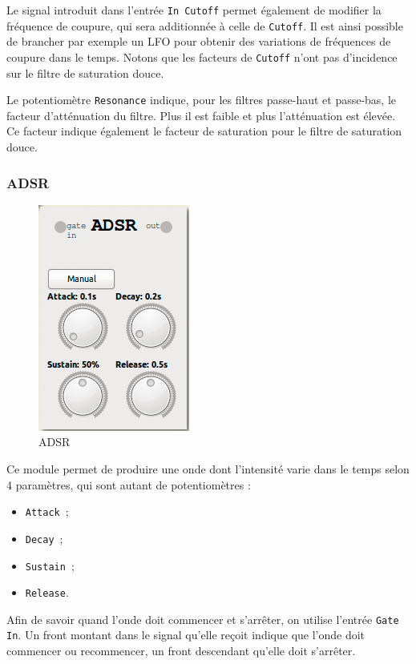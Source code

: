 \documentclass[a4paper,oneside,frenchb,12pt]{article}
\begin{document}
Le signal introduit dans l'entrée \verb!In Cutoff! permet également de
modifier la fréquence de coupure, qui sera additionnée à celle de
\verb!Cutoff!. Il est ainsi possible de brancher par exemple un LFO pour
obtenir des variations de fréquences de coupure dans le temps. Notons
que les facteurs de \verb!Cutoff! n'ont pas d'incidence sur le filtre de
saturation douce.

Le potentiomètre \verb!Resonance! indique, pour les filtres passe-haut
et passe-bas, le facteur d'atténuation du filtre. Plus il est faible et
plus l'atténuation est élevée. Ce facteur indique également le facteur
de saturation pour le filtre de saturation douce.

\subsubsection{ADSR}

\begin{figure}[h!]
\centering
\includegraphics[scale=0.5]{../img/png/adsr.png}
\caption{ADSR}
\end{figure}

Ce module permet de produire une onde dont l'intensité varie dans le
temps selon 4 paramètres, qui sont autant de potentiomètres :

\begin{itemize}
\item
  \verb!Attack!~;
\item
  \verb!Decay!~;
\item
  \verb!Sustain!~;
\item
  \verb!Release!.
\end{itemize}
Afin de savoir quand l'onde doit commencer et s'arrêter, on utilise
l'entrée \verb!Gate In!. Un front montant dans le signal qu'elle reçoit
indique que l'onde doit commencer ou recommencer, un front descendant
qu'elle doit s'arrêter.
\end{document}
